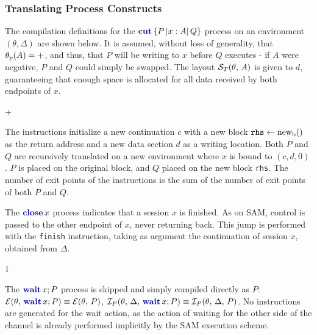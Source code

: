 \documentclass[sigconf,nonacm,natbib=true]{acmart}
\begin{document}
\subsubsection{Translating Process Constructs}

The compilation definitions for the $\cutc{P}{x:A}{Q}$ process on an environment $(\theta, \Delta)$ are shown below. It is assumed, without loss of generality, that $\theta_{p}(A) = +$, and thus, that $P$ will be writing to $x$ before $Q$ executes - if $A$ were negative, $P$ and $Q$ could simply be swapped. The layout $\mathcal{S}_T(\theta,\,A)$ is given to $d$, guaranteeing that enough space is allocated for all data received by both endpoints of $x$.
\begin{compilation}{\theta}{\Delta}{}
{ + }
\end{compilation}

The instructions initialize a new continuation $c$ with a new block $\texttt{rhs} \leftarrow \text{new}_{\text{b}}()$ as the return address and a new data section $d$ as a writing location. Both $P$ and $Q$ are recursively translated on a new environment where $x$ is bound to $(c, d, 0)$. $P$ is placed on the original block, and $Q$ placed on the new block \texttt{rhs}. The number of exit points of the instructions is the sum of the number of exit points of both $P$ and $Q$. 

The $\closec{x}$ process indicates that a session $x$ is finished. As on \ac{SAM}, control is passed to the other endpoint of $x$, never returning back. This jump is performed with the \texttt{finish} instruction, taking as argument the continuation of session $x$, obtained from $\Delta$.
\begin{compilation}{\theta}{\Delta}{}{1}
\end{compilation}

The $\waitc{x}{P}$ process is skipped and simply compiled directly as $P$: $\getendpoints{\theta}{\waitc{x}{P}} \equiv \getendpoints{\theta}{P}$, $\getinstructions{\theta}{\Delta}{\waitc{x}{P}} \equiv \getinstructions{\theta}{\Delta}{P}$. No instructions are generated for the wait action, as the action of waiting for the other side of the channel is already performed implicitly by the \ac{SAM} execution scheme.
\end{document}
